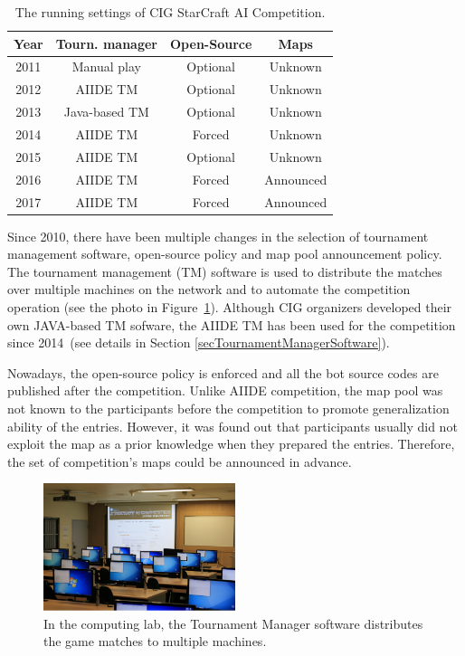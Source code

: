 \begin{table}[h] 
 
 \begin{center}
 \begin{tabular} {| c c c c |}
 \hline
 Year & Tourn. manager & Open-Source & Maps \\
 \hline
 2011 & Manual play & Optional & Unknown \\
 \hline
 2012 & AIIDE TM & Optional & Unknown \\
 \hline
 2013 & Java-based TM & Optional & Unknown \\
 \hline
 2014 & AIIDE TM & Forced & Unknown \\
 \hline
 2015 & AIIDE TM & Optional & Unknown \\
 \hline
 2016 & AIIDE TM & Forced & Announced \\ 
 \hline
 2017 & AIIDE TM & Forced & Announced \\ 
 \hline   
 \end{tabular}
 \end{center}  
 \caption{The running settings of CIG StarCraft AI Competition.}
 \label{tableCIG}
\end{table} 

Since 2010, there have been multiple changes in the selection of tournament management software, open-source policy and map pool announcement policy. The tournament management (TM) software is used to distribute the matches over multiple machines on the network and to automate the competition operation (see the photo in Figure~\ref{figCIGruns}). Although CIG organizers developed their own JAVA-based TM sofware, the AIIDE TM has been used for the competition since 2014~(see details in Section \ref{secTournamentManagerSoftware}). 

Nowadays, the open-source policy is enforced and all the bot source codes are published after the competition. Unlike AIIDE competition, the map pool was not known to the participants before the competition to promote generalization ability of the entries. However, it was found out that participants usually did not exploit the map as a prior knowledge when they prepared the entries. Therefore, the set of competition's maps could be announced in advance. 

\begin{figure}[h]
  \centering
  \includegraphics[width=0.5\textwidth]{fig/cig-starcraft-runs.png}
  \caption{In the computing lab, the Tournament Manager software distributes the game matches to multiple machines.}
  \label{figCIGruns}
\end{figure}


